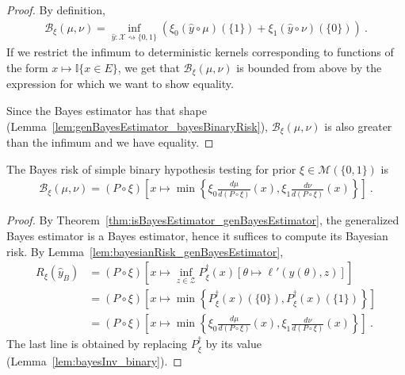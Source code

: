 \begin{proof}\leanok
{}
By definition,
\begin{align*}
\mathcal B_\xi(\mu, \nu)
= \inf_{\hat{y} : \mathcal X \rightsquigarrow \{0,1\}}\left(\xi_0 (\hat{y} \circ \mu)(\{1\}) + \xi_1 (\hat{y} \circ \nu)(\{0\})\right)
\: .
\end{align*}
If we restrict the infimum to deterministic kernels corresponding to functions of the form $x \mapsto \mathbb{I}\{x \in E\}$, we get that $\mathcal B_\xi(\mu, \nu)$ is bounded from above by the expression for which we want to show equality.

Since the Bayes estimator has that shape (Lemma~\ref{lem:genBayesEstimator_bayesBinaryRisk}), $\mathcal B_\xi(\mu, \nu)$ is also greater than the infimum and we have equality.
\end{proof}


\begin{theorem}
  \label{thm:bayesBinaryRisk_eq}
  \leanok
  The Bayes risk of simple binary hypothesis testing for prior $\xi \in \mathcal M(\{0,1\})$ is
  \begin{align*}
  \mathcal B_\xi(\mu, \nu) = (P \circ \xi)\left[x \mapsto \min \left\{\xi_0\frac{d \mu}{d(P \circ \xi)}(x), \xi_1\frac{d \nu}{d(P \circ \xi)}(x)\right\}\right]
  \: .
  \end{align*}
\end{theorem}

\begin{proof}\leanok
{}
By Theorem~\ref{thm:isBayesEstimator_genBayesEstimator}, the generalized Bayes estimator is a Bayes estimator, hence it suffices to compute its Bayesian risk.
By Lemma~\ref{lem:bayesianRisk_genBayesEstimator},
\begin{align*}
R_\xi(\hat{y}_B)
&= (P \circ \xi)\left[x \mapsto \inf_{z \in \mathcal Z} P_\xi^\dagger(x) \left[\theta \mapsto \ell'(y(\theta), z)\right]\right]
\\
&= (P \circ \xi)\left[x \mapsto \min \left\{P_\xi^\dagger(x)(\{0\}), P_\xi^\dagger(x)(\{1\})\right\}\right]
\\
&= (P \circ \xi)\left[x \mapsto \min \left\{\xi_0\frac{d \mu}{d(P \circ \xi)}(x), \xi_1\frac{d \nu}{d(P \circ \xi)}(x)\right\}\right]
\: .
\end{align*}
The last line is obtained by replacing $P_\xi^\dagger$ by its value (Lemma~\ref{lem:bayesInv_binary}).
\end{proof}


